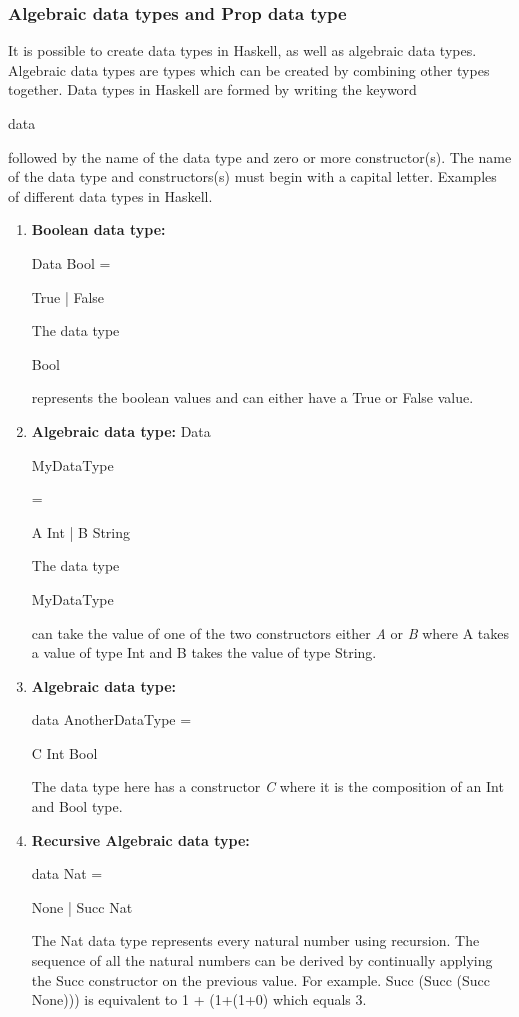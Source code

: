 \documentclass{article}%
\begin{document}
\subsubsection{Algebraic data types and Prop data type}
It is possible to create data types in Haskell, as well as algebraic data types. Algebraic data types are types which can be created by combining other types together.
Data types in Haskell are formed by writing the keyword \begin{myKeyWordStyle}data\end{myKeyWordStyle} followed by the name of the data type and zero or more constructor(s). The name of the data type and constructors(s) must begin with a capital letter.
Examples of different data types in Haskell.
\begin{enumerate}
\item\textbf{Boolean data type:}
\begin{myTypeNameStyle}Data Bool = \begin{myConstructorStyle}True | False\end{myConstructorStyle} \end{myTypeNameStyle}
The data type \begin{myTypeVarStyle}Bool\end{myTypeVarStyle} represents the boolean values and can either have a True or False value. 
\item\textbf{Algebraic data type:}
Data \begin{myTypeNameStyle} MyDataType \end{myTypeNameStyle} = \begin{myConstructorStyle}  A Int | B String  \end{myConstructorStyle} 
The data type \begin {myTypeVarStyle}MyDataType \end{myTypeVarStyle} can take the value of one of the two constructors either \textit{A} or \textit{B} where A takes a value of type Int and B takes the value of type String.
\item\textbf{Algebraic data type:}
\begin{myTypeNameStyle}data AnotherDataType = \begin{myConstructorStyle}C Int Bool\end{myConstructorStyle}\end{myTypeNameStyle}
The data type here has a constructor \textit{C} where it is the composition of an Int and Bool type. 
\item\textbf{Recursive Algebraic data type:}
\begin{myTypeNameStyle}data Nat = \begin{myConstructorStyle}None | Succ Nat \end{myConstructorStyle}\end{myTypeNameStyle}
The Nat data type represents every natural number using recursion. The sequence of all the natural numbers can be derived by continually applying the Succ constructor on the previous value. 
For example. Succ (Succ (Succ None))) is equivalent to 1 + (1+(1+0) which equals 3.
\end{enumerate}
\end{document}
